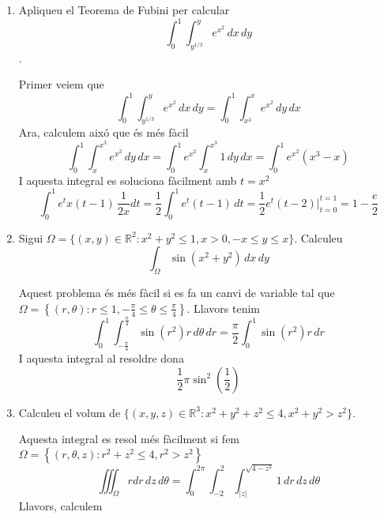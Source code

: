 \documentclass[a4paper, 12pt]{article}
\begin{document}
    \begin{exercici}
        \begin{enumerate}[label=\alph*)]
            \item Apliqueu el Teorema de Fubini per calcular \[ \int_0^1 \int_{y^{1/3}}^y e^{x^2} \, dx \, dy \].
            \begin{solucio}
                Primer veiem que \[ \int_0^1 \int_{y^{1/3}}^y e^{x^2} \, dx \, dy = \int_0^1 \int_{x^3}^x e^{x^2} \, dy \, dx \]
                Ara, calculem aixó que és més fàcil
                $$\int_0^1 \int_{x}^{x^3} e^{x^2} \, dy \, dx = \int_0^1 e^{x^2} \int_{x}^{x^3} 1\, dy \, dx = \int_0^1 e^{x^2} \left(x^3-x\right)$$
                I aquesta integral es soluciona fàcilment amb $t = x^2$
                $$\int_0^1 e^{t}x \left(t-1\right)\, \frac{1}{2x}dt = \frac{1}{2}\int_0^1 e^{t} \left(t-1\right)\, dt = \frac{1}{2} e^{t} \left(t-2\right)\bigg\rvert_{t=0}^{t=1} = 1-\frac{e}{2}$$
            \end{solucio}
            \item Sigui \( \Omega = \{ (x, y) \in \mathbb{R}^2 : x^2 + y^2 \leq 1, x > 0, -x \leq y \leq x \} \). Calculeu \[ \int_\Omega \sin(x^2 + y^2) \, dx \, dy \]
            \begin{solucio}
                Aquest problema és més fàcil si es fa un canvi de variable tal que $\Omega = \left\{\left(r, \theta\right): r \leq 1, -\frac{\pi}{4} \leq \theta \leq \frac{\pi}{4}\right\}$. Llavors tenim
                $$\int_{0}^{1} \int_{-\frac{\pi}{4}}^{\frac{\pi}{4}} \sin{\left(r^2\right)}r\, d\theta \, dr = \frac{\pi}{2}\int_{0}^{1} \sin{\left(r^2\right)}r \, dr$$
                I aquesta integral al resoldre dona
                $$\frac{1}{2}\pi\sin^2\left(\frac{1}{2}\right)$$
            \end{solucio}
            \item Calculeu el volum de \( \{ (x, y, z) \in \mathbb{R}^3 : x^2 + y^2 + z^2 \leq 4, x^2 + y^2 > z^2 \} \).\\
            \begin{solucio}
                Aquesta integral es resol més fàcilment si fem $\Omega = \left\{\left(r, \theta, z\right): r^2+z^2 \leq 4, r^2 > z^2\right\}$
                \begin{displaymath}
                    \iiint_\Omega r dr\,dz\,d\theta = \int_{0}^{2\pi} \int_{-2}^2 \int_{\left\lvert z\right\rvert}^{\sqrt{4-z^2}} 1\,dr\, dz\, d\theta
                \end{displaymath}
                Llavors, calculem

\end{solucio}
\end{enumerate}
\end{exercici}
\end{document}
